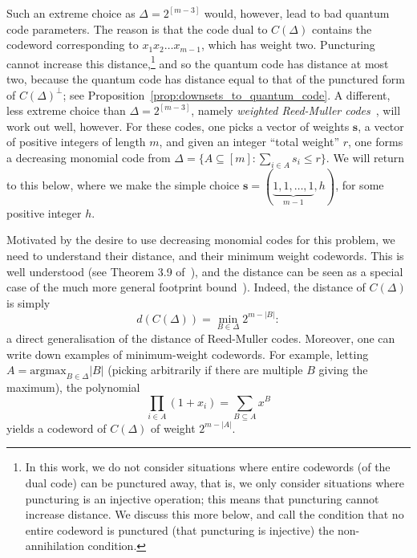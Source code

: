 \documentclass{article}
\begin{document}
Such an extreme choice as $\Delta = 2^{[m-3]}$ would, however, lead to bad quantum code parameters. The reason is that the code dual to $C(\Delta)$ contains the codeword corresponding to $x_1x_2\ldots x_{m-1}$, which has weight two. Puncturing cannot increase this distance,\footnote{In this work, we do not consider situations where entire codewords (of the dual code) can be punctured away, that is, we only consider situations where puncturing is an injective operation; this means that puncturing cannot increase distance. We discuss this more below, and call the condition that no entire codeword is punctured (that puncturing is injective) the non-annihilation condition.} and so the quantum code has distance at most two, because the quantum code has distance equal to that of the punctured form of $C(\Delta)^\perp$; see Proposition~\ref{prop:downsets_to_quantum_code}. A different, less extreme choice than $\Delta = 2^{[m-3]}$, namely \textit{weighted Reed-Muller codes}~\cite{sorensen1992weighted,geil2013weighted}, will work out well, however. For these codes, one picks a vector of weights $\boldsymbol{s}$, a vector of positive integers of length $m$, and given an integer ``total weight'' $r$, one forms a decreasing monomial code from $\Delta = \{A \subseteq [m]: \sum_{i \in A}s_i \leq r\}$. We will return to this below, where we make the simple choice $\boldsymbol{s} = (\underbrace{1, 1, \ldots, 1}_{m-1}, h)$, for some positive integer $h$.

Motivated by the desire to use decreasing monomial codes for this problem, we need to understand their distance, and their minimum weight codewords. This is well understood (see Theorem 3.9 of~\cite{camps2020polar}), and the distance can be seen as a special case of the much more general footprint bound~\cite{hoholdt1998or,geil2000footprints}). Indeed, the distance of $C(\Delta)$ is simply
\begin{equation}
    d(C(\Delta)) = \min_{B \in \Delta}2^{m-|B|}:
\end{equation}
a direct generalisation of the distance of Reed-Muller codes. Moreover, one can write down examples of minimum-weight codewords. For example, letting $A = \text{argmax}_{B \in \Delta}|B|$ (picking arbitrarily if there are multiple $B$ giving the maximum), the polynomial
\begin{equation}
    \prod_{i \in A}(1+x_i) = \sum_{B \subseteq A}x^B
\end{equation}
yields a codeword of $C(\Delta)$ of weight $2^{m-|A|}$.
\end{document}
